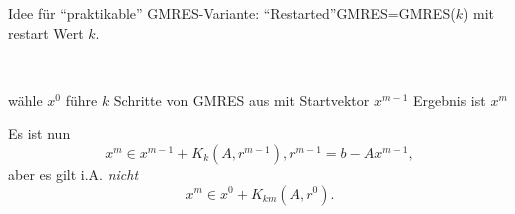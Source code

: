 Idee f\"ur "`praktikable"' GMRES-Variante: "`Restarted"'GMRES=GMRES($k$)
mit restart Wert $k$.
\begin{alg}[GMRES($k$)]
~               %
\vspace*{-2\baselineskip}       %
\begin{algorithm}
  \begin{algorithmic}
    \STATE w\"ahle $x^0$
      \STATE f\"uhre $k$ Schritte von GMRES aus mit Startvektor $x^{m-1}$
      \STATE Ergebnis ist $x^m$
    \ENDFOR
  \end{algorithmic}
\end{algorithm}
\end{alg}
Es ist nun $$ x^m \in x^{m-1}+K_k(A,r^{m-1}), r^{m-1}=b-Ax^{m-1},$$
aber es gilt i.A. {\em nicht}
\[
x^m \in x^0 + K_{km}(A,r^0).
\]

